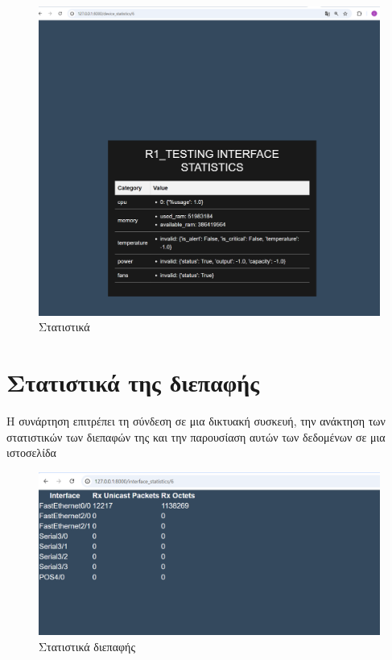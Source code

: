 \begin{figure}[h]
	\centering
	\includegraphics[width=1.0\textwidth]{graphics/statistics.png}
	\caption{Στατιστικά}
\end{figure}

\section{Στατιστικά της διεπαφής}

Η συνάρτηση επιτρέπει τη σύνδεση σε μια δικτυακή συσκευή, την ανάκτηση των στατιστικών των διεπαφών της και την παρουσίαση αυτών των δεδομένων σε μια ιστοσελίδα

\FloatBarrier

\begin{figure}[h]
	\centering
	\includegraphics[width=1.0\textwidth]{graphics/interface_statistics.png}
	\caption{Στατιστικά διεπαφής}
\end{figure}


